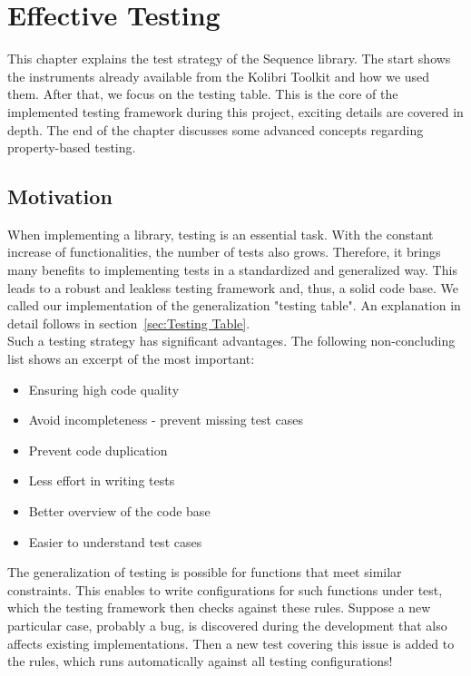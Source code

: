 \chapter{Effective Testing}
\label{chap:Effective_Testing}
This chapter explains the test strategy of the Sequence library. The start
shows the instruments already available from the Kolibri Toolkit and
how we used them. After that, we focus on the testing table. 
This is the core of the implemented testing framework during this project,
exciting details are covered in depth. The end of the chapter discusses some
advanced concepts regarding property-based testing.

\section{Motivation}
\label{sec:Motivation}
When implementing a library, testing is an essential task. With the constant
increase of functionalities, the number of tests also grows. Therefore, it
brings many benefits to implementing tests in a standardized and generalized
way. This leads to a robust and leakless testing framework and, thus, a solid
code base. We called our implementation of the generalization "testing table".
An explanation in detail follows in section~\ref{sec:Testing Table}. \\
Such a testing strategy has significant advantages. The following
non-concluding list shows an excerpt of the most important:

\begin{itemize}
  \item{Ensuring high code quality}
  \item{Avoid incompleteness - prevent missing test cases}
  \item{Prevent code duplication}
  \item{Less effort in writing tests}
  \item{Better overview of the code base}
  \item{Easier to understand test cases}
\end{itemize}

The generalization of testing is possible for functions that meet similar
constraints. This enables to write configurations for such functions under
test, which the testing framework then checks against these rules. Suppose a
new particular case, probably a bug, is discovered during the development that
also affects existing implementations. Then a new test covering this issue is
added to the rules, which runs automatically against all testing
configurations!

